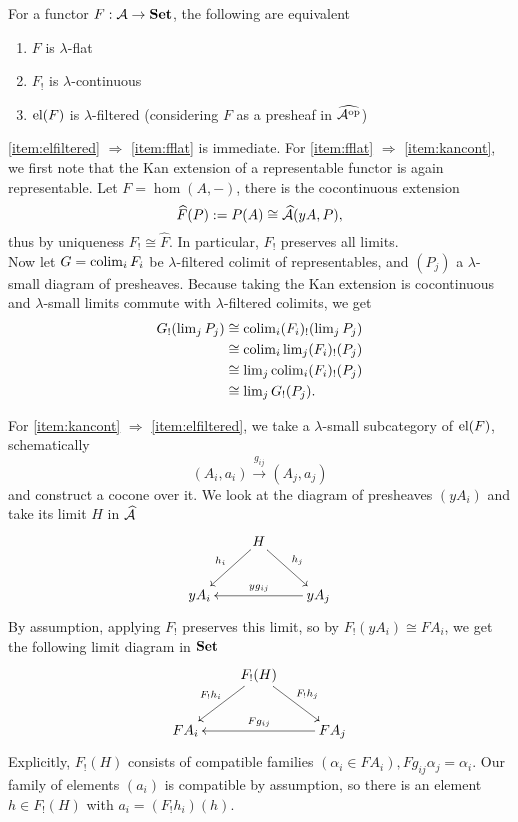 \begin{Proposition}\label{prop:flat}
For a functor $F : \mathcal{A} \to \mathbf{Set}$, the following are equivalent
\begin{enumerate}
\item $F$ is $\lambda$-flat \label{item:fflat}
\item $F_!$ is $\lambda$-continuous \label{item:kancont}
\item $\textrm{el}(F)$ is $\lambda$-filtered (considering $F$ as a presheaf in $\widehat{\mathcal{A}^{\textrm{op}}}$) \label{item:elfiltered}
\end{enumerate}
\end{Proposition}
\begin{Proof}
\ref{item:elfiltered} $\Rightarrow$ \ref{item:fflat} is immediate. For \ref{item:fflat} $\Rightarrow$ \ref{item:kancont}, we first note that the Kan extension of a representable functor is again representable. Let $F=\hom(A,-)$, there is the cocontinuous extension \[ \widehat F(P) := P(A) \cong \widehat{\mathcal{A}}(yA,P), \]
thus by uniqueness $F_! \cong \widehat F$. In particular, $F_!$ preserves all limits. \\

Now let $G = \operatorname{colim}_i F_i$ be $\lambda$-filtered colimit of representables, and $(P_j)$ a $\lambda$-small diagram of presheaves. Because taking the Kan extension is cocontinuous and $\lambda$-small limits commute with $\lambda$-filtered colimits, we get
\begin{align*}
G_!(\operatorname{lim}_j P_j) &\cong \operatorname{colim}_i (F_i)_!(\operatorname{lim}_j P_j) \\
&\cong \operatorname{colim}_i \operatorname{lim}_j (F_i)_!(P_j) \\
&\cong \operatorname{lim}_j  \operatorname{colim}_i (F_i)_!(P_j) \\
&\cong \operatorname{lim}_j G_!(P_j).
\end{align*}

For \ref{item:kancont} $\Rightarrow$ \ref{item:elfiltered}, we take a $\lambda$-small subcategory of $\textrm{el}(F)$, schematically
\[ (A_i,a_i) \xrightarrow{g_{ij}} (A_j,a_j) \]
and construct a cocone over it. We look at the diagram of presheaves $(yA_i)$ and take its limit $H$ in $\widehat{\mathcal{A}}$
\[
\xymatrix{
& H \ar[ld]_{h_i} \ar[rd]^{h_j} \\
yA_i & & yA_j \ar[ll]_{yg_{ij}}
}\]
By assumption, applying $F_!$ preserves this limit, so by $F_!(yA_i) \cong FA_i$, we get the following limit diagram in $\mathbf{Set}$
\[
\xymatrix{
& F_!(H) \ar[ld]_{F_!h_i} \ar[rd]^{F_!h_j} \\
FA_i & & FA_j \ar[ll]_{Fg_{ij}}
}\]
Explicitly, $F_!(H)$ consists of compatible families $(\alpha_i \in FA_i), Fg_{ij}\alpha_j = \alpha_i$. Our family of elements $(a_i)$ is compatible by assumption, so there is an element $h \in F_!(H)$ with $a_i = (F_!h_i)(h)$. \\


\end{Proof}
